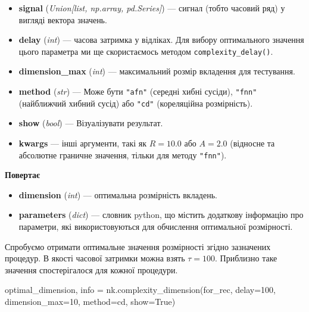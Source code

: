 \documentclass[
  letterpaper,
]{report}
\newenvironment{Shaded}{\begin{snugshade}}{\end{snugshade}}
\newcommand{\DecValTok}[1]{\textcolor[rgb]{0.68,0.00,0.00}{#1}}
\newcommand{\NormalTok}[1]{\textcolor[rgb]{0.00,0.23,0.31}{#1}}
\newcommand{\OperatorTok}[1]{\textcolor[rgb]{0.37,0.37,0.37}{#1}}
\newcommand{\StringTok}[1]{\textcolor[rgb]{0.13,0.47,0.30}{#1}}
\newcommand{\VariableTok}[1]{\textcolor[rgb]{0.07,0.07,0.07}{#1}}
\providecommand{\tightlist}{%
  \setlength{\itemsep}{0pt}\setlength{\parskip}{0pt}}\usepackage{longtable,booktabs,array}
\begin{document}
\begin{itemize}
\tightlist
\item
  \textbf{signal} (\emph{Union{[}list, np.array, pd.Series{]}}) ---
  сигнал (тобто часовий ряд) у вигляді вектора значень.
\item
  \textbf{delay} (\emph{int}) --- часова затримка у відліках. Для вибору
  оптимального значення цього параметра ми ще скористаємось методом
  \texttt{complexity\_delay()}.
\item
  \textbf{dimension\_max} (\emph{int}) --- максимальний розмір вкладення
  для тестування.
\item
  \textbf{method} (\emph{str}) --- Може бути \texttt{"afn"} (середні
  хибні сусіди), \texttt{"fnn"} (найближчий хибний сусід) або
  \texttt{"cd"} (кореляційна розмірність).
\item
  \textbf{show} (\emph{bool}) --- Візуалізувати результат.
\item
  \textbf{kwargs} --- інші аргументи, такі як \(R=10.0\) або \(A=2.0\)
  (відносне та абсолютне граничне значення, тільки для методу
  \texttt{"fnn"}).
\end{itemize}

\textbf{Повертає}

\begin{itemize}
\tightlist
\item
  \textbf{dimension} (\emph{int}) --- оптимальна розмірність вкладень.
\item
  \textbf{parameters} (\emph{dict}) --- словник python, що містить
  додаткову інформацію про параметри, які використовуються для
  обчислення оптимальної розмірності.
\end{itemize}

Спробуємо отримати оптимальне значення розмірності згідно зазначених
процедур. В якості часової затримки можна взять \(\tau=100\). Приблизно
таке значення спостерігалося для кожної процедури.

\begin{Shaded}
\begin{Highlighting}[]
\NormalTok{optimal\_dimension, info }\OperatorTok{=}\NormalTok{ nk.complexity\_dimension(for\_rec,}
\NormalTok{                                                  delay}\OperatorTok{=}\DecValTok{100}\NormalTok{,}
\NormalTok{                                                  dimension\_max}\OperatorTok{=}\DecValTok{10}\NormalTok{,}
\NormalTok{                                                  method}\OperatorTok{=}\StringTok{\textquotesingle{}cd\textquotesingle{}}\NormalTok{,}
\NormalTok{                                                  show}\OperatorTok{=}\VariableTok{True}\NormalTok{)}
\end{Highlighting}
\end{Shaded}
\end{document}
